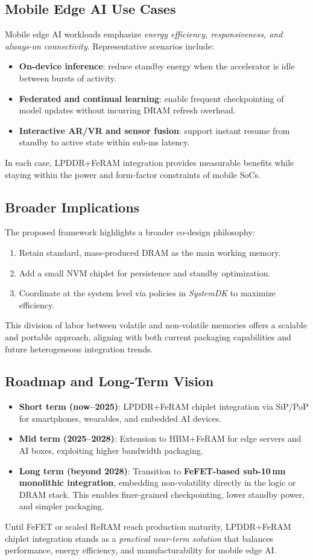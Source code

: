 \subsection{Mobile Edge AI Use Cases}
Mobile edge AI workloads emphasize \emph{energy efficiency, responsiveness, and always-on connectivity}. 
Representative scenarios include:
\begin{itemize}
  \item \textbf{On-device inference}: reduce standby energy when the accelerator is idle between bursts of activity.
  \item \textbf{Federated and continual learning}: enable frequent checkpointing of model updates without incurring DRAM refresh overhead.
  \item \textbf{Interactive AR/VR and sensor fusion}: support instant resume from standby to active state within sub-ms latency.
\end{itemize}
In each case, LPDDR+FeRAM integration provides measurable benefits while staying within the power and form-factor constraints of mobile SoCs.

\subsection{Broader Implications}
The proposed framework highlights a broader co-design philosophy:
\begin{enumerate}
  \item Retain standard, mass-produced DRAM as the main working memory.
  \item Add a small NVM chiplet for persistence and standby optimization.
  \item Coordinate at the system level via policies in \emph{SystemDK} to maximize efficiency.
\end{enumerate}
This division of labor between volatile and non-volatile memories offers a scalable and portable approach, aligning with both current packaging capabilities and future heterogeneous integration trends.

\subsection{Roadmap and Long-Term Vision}
\begin{itemize}
  \item \textbf{Short term (now--2025)}: LPDDR+FeRAM chiplet integration via SiP/PoP for smartphones, wearables, and embedded AI devices.
  \item \textbf{Mid term (2025--2028)}: Extension to HBM+FeRAM for edge servers and AI boxes, exploiting higher bandwidth packaging.
  \item \textbf{Long term (beyond 2028)}: Transition to \textbf{FeFET-based sub-10\,nm monolithic integration}, embedding non-volatility directly in the logic or DRAM stack. 
  This enables finer-grained checkpointing, lower standby power, and simpler packaging.
\end{itemize}

Until FeFET or scaled ReRAM reach production maturity, LPDDR+FeRAM chiplet integration stands as a \emph{practical near-term solution} that balances performance, energy efficiency, and manufacturability for mobile edge AI.
